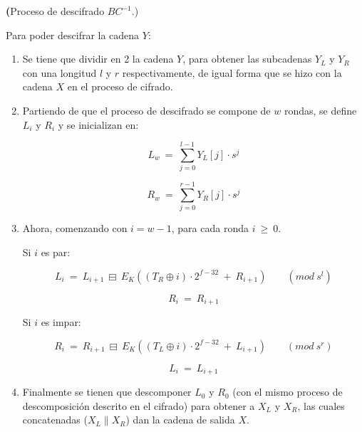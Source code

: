 
\textbf(Proceso de descifrado $BC^{-1}$.)

Para poder descifrar la cadena $Y$:

\begin{enumerate}

  \item Se tiene que dividir en 2 la cadena $Y$, para obtener las subcadenas 
    $Y_L$ y $Y_R$ con una longitud $l$ y $r$ respectivamente, de igual forma 
    que se hizo con la cadena $X$ en el proceso de cifrado.    

  \item Partiendo de que el proceso de descifrado se compone de $w$ rondas, 
    se define $L_i$ y $R_i$ y se inicializan en:

    \begin{equation}
      L_w\: =\: \sum_{j=0}^{l-1} Y_L[j] \cdot s^j
    \end{equation}

    \begin{equation}
      R_w\: =\: \sum_{j=0}^{r-1} Y_R[j] \cdot s^j
    \end{equation}
  
  \item Ahora, comenzando con $i=w-1$, para cada ronda $i\: \geq\: 0$.

    Si $i$ es par:

    \begin{equation}
      L_i\: =\: L_{i+1}\: \boxminus\: 
                E_K((T_R \oplus i) \cdot 2^{f-32}\: +\: R_{i+1})\qquad 
                (mod\ s^l)
    \end{equation}

    \begin{equation}
      R_i\: =\: R_{i+1}
    \end{equation}

    Si $i$ es impar:

    \begin{equation}
      R_i\: =\: R_{i+1}\: \boxminus\: 
                E_K((T_L \oplus i) \cdot 2^{f-32}\: +\: L_{i+1})\qquad 
                (mod\ s^r)
    \end{equation}

    \begin{equation}
      L_i\: =\: L_{i+1}
    \end{equation}
  
  \item Finalmente se tienen que descomponer $L_0$ y $R_0$ (con el mismo 
    proceso de descomposición descrito en el cifrado) para obtener a $X_L$ y 
    $X_R$, las cuales concatenadas ($X_L \parallel X_R$) dan la cadena de 
    salida $X$.

\end{enumerate}

